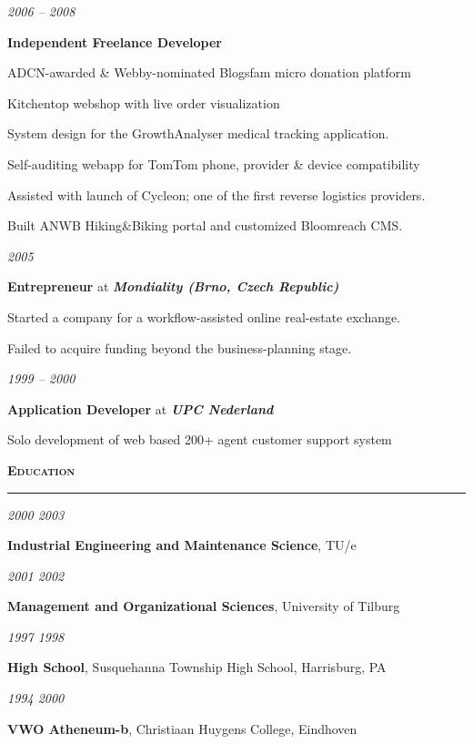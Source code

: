 \documentclass[a4paper,11pt]{article}
\newlength{\sectionindent}
\newlength{\marginwidth}
\newlength{\sectionheaderindent}
\newcommand{\sectionheader}[1]{
    \vspace{1mm}
    \begin{minipage}[t]{\textwidth}
        \hspace{\sectionheaderindent}\textbf{\textsc{#1}}\\[-8pt\baselineskip] 
        \rule{\textwidth}{1pt}
    \end{minipage}\strut\vspace{3mm}}
\newcommand{\margin}[1]{
    \begin{minipage}[t]{\dimexpr\sectionindent-\marginwidth}
        \begin{flushright}
            \textit{#1}
        \end{flushright}
    \end{minipage}
    \hspace{\marginwidth}}
\newenvironment{descriptionsection}{
    \begingroup
    \setlength{\parskip}{4pt plus 2pt minus 1pt} 
}{
    \endgroup
}
\newcommand{\jobentry}[4]{
    \margin{#1}
    \begin{minipage}[t]{\dimexpr\textwidth-\sectionindent}
        \textbf{#2} at \textit{\textbf{#3}}\\[1pt]
        \begin{descriptionsection}
        #4
        \end{descriptionsection}
    \end{minipage}\vspace{4pt}}
\newcommand{\itemizedjobentry}[3]{
  \margin{#1}
  \begin{minipage}[t]{\dimexpr\textwidth-\sectionindent}
    \textbf{#2}
    \vspace{1pt}
    \begin{customitemize}
      #3
    \end{customitemize}
    \vspace{1pt}
  \end{minipage}}
\newcommand{\educationentry}[4]{
    \margin{
        #1 \ifthenelse{\equal{#1}{}}{}{--} #2
    }
    \begin{minipage}[t]{\dimexpr\textwidth-\sectionindent}
        \textbf{#3}, #4
    \end{minipage}
    \par}
\begin{document}
\itemizedjobentry{2006 -- 2008}{Independent Freelance Developer}{
    \item ADCN-awarded \& Webby-nominated Blogsfam micro donation platform
    \item Kitchentop webshop with live order visualization
    \item System design for the GrowthAnalyser medical tracking application.
    \item Self-auditing webapp for TomTom phone, provider \& device compatibility
    \item Assisted with launch of Cycleon; one of the first reverse logistics providers.
    \item Built ANWB Hiking\&Biking portal and customized Bloomreach CMS.
}

\jobentry{2005}{Entrepreneur}{Mondiality (Brno, Czech Republic)}{
Started a company for a workflow-assisted online real-estate exchange.

Failed to acquire funding beyond the business-planning stage.}

\jobentry{1999 -- 2000}{Application Developer}{UPC Nederland}{Solo development of web based 200+ agent customer support system}

\sectionheader{Education}
\educationentry{2000}{2003}{Industrial Engineering and Maintenance Science}{TU/e}
\educationentry{2001}{2002}{Management and Organizational Sciences}{University of Tilburg}
\educationentry{1997}{1998}{High School}{Susquehanna Township High School, Harrisburg, PA}
\educationentry{1994}{2000}{VWO Atheneum-b}{Christiaan Huygens College, Eindhoven}
\end{document}
